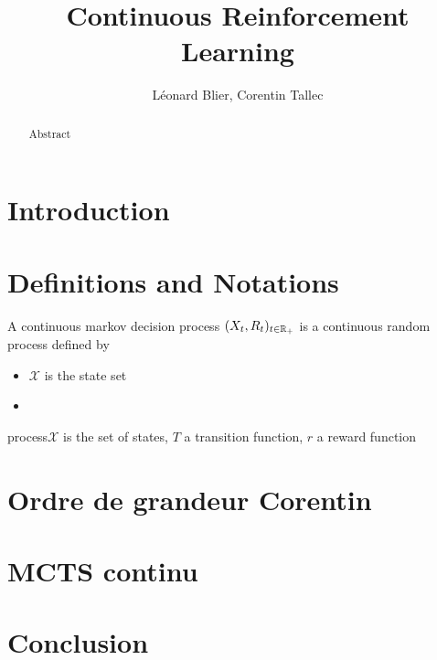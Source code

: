 \documentclass{article}
\title{Continuous Reinforcement Learning}
\author{L\'eonard Blier, Corentin Tallec}
\begin{document}
\maketitle


\begin{abstract}
Abstract
\end{abstract}



\section{Introduction}
\label{sec:introduction}


\section{Definitions and Notations}
\label{sec:definitions}

\begin{definition}
  A continuous markov decision process $(X_{t}, R_{t})_{t\in\mathbb{R}_{+}}$ is a continuous random process defined by 
  \begin{itemize}
  \item $\mathcal{X}$ is the state set 
  \item 
  \end{itemize}
  process$\mathcal{X}$ is the set of states, $T$ a transition function, $r$ a reward function
\end{definition}


\section{Ordre de grandeur Corentin}
\label{sec:ordre-de-grandeur}

\section{MCTS continu}
\label{sec:mcts-continu}


\section{Conclusion}
\label{sec:conclusion}
\end{document}
